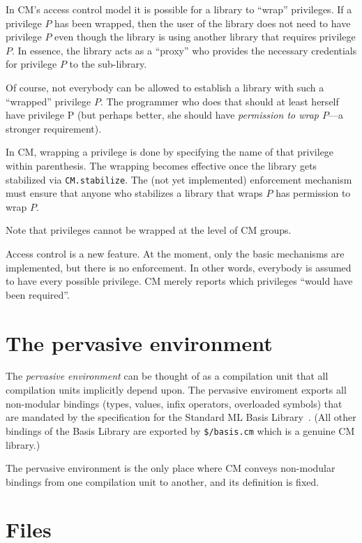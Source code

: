 \documentclass[titlepage,letterpaper]{article}
\begin{document}
In CM's access control model it is possible for a library to ``wrap''
privileges.  If a privilege $P$ has been wrapped, then the user of the
library does not need to have privilege $P$ even though the library is
using another library that requires privilege $P$.  In essence, the
library acts as a ``proxy'' who provides the necessary credentials for
privilege $P$ to the sub-library.

Of course, not everybody can be allowed to establish a library with
such a ``wrapped'' privilege $P$.  The programmer who does that should at
least herself have privilege P (but perhaps better, she should have
{\em permission to wrap $P$}---a stronger requirement).

In CM, wrapping a privilege is done by specifying the name of that
privilege within parenthesis.  The wrapping becomes effective once the
library gets stabilized via {\tt CM.stabilize}.  The (not yet
implemented) enforcement mechanism must ensure that anyone who
stabilizes a library that wraps $P$ has permission to wrap $P$.

Note that privileges cannot be wrapped at the level of CM groups.

Access control is a new feature. At the moment, only the basic
mechanisms are implemented, but there is no enforcement.  In other
words, everybody is assumed to have every possible privilege.  CM
merely reports which privileges ``would have been required''.

\section{The pervasive environment}

The {\em pervasive environment} can be thought of as a compilation
unit that all compilation units implicitly depend upon.  The pervasive
enviroment exports all non-modular bindings (types, values, infix
operators, overloaded symbols) that are mandated by the specification
for the Standard ML Basis Library~\cite{reppy99:basis}.  (All other
bindings of the Basis Library are exported by {\tt \$/basis.cm} which is
a genuine CM library.)

The pervasive environment is the only place where CM conveys
non-modular bindings from one compilation unit to another, and its
definition is fixed.

\section{Files}
\label{sec:files}
\end{document}
